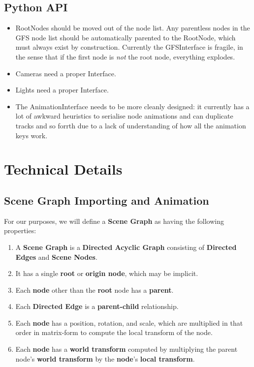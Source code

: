 \documentclass{article}
\begin{document}
\subsection{Python API}
\begin{itemize}
\item RootNodes should be moved out of the node list. Any parentless nodes in the GFS node list should be automatically parented to the RootNode, which must always exist by construction. Currently the GFSInterface is fragile, in the sense that if the first node is \textit{not} the root node, everything explodes.
\item Cameras need a proper Interface.
\item Lights need a proper Interface.
\item The AnimationInterface needs to be more cleanly designed: it currently has a lot of awkward heuristics to serialise node animations and can duplicate tracks and so forrth due to a lack of understanding of how all the animation keys work.
\end{itemize}

\clearpage

\section{Technical Details}
\subsection{Scene Graph Importing and Animation}

For our purposes, we will define a \textbf{Scene Graph} as having the following properties:
\begin{enumerate}
\item A \textbf{Scene Graph} is a \textbf{Directed Acyclic Graph} consisting of \textbf{Directed Edges} and \textbf{Scene Nodes}.
\item It has a single \textbf{root} or \textbf{origin node}, which may be implicit.
\item Each \textbf{node} other than the \textbf{root} node has a \textbf{parent}.
\item Each \textbf{Directed Edge} is a \textbf{parent-child} relationship.
\item Each \textbf{node} has a position, rotation, and scale, which are multiplied in that order in matrix-form to compute the local transform of the node.
\item Each \textbf{node} has a \textbf{world transform} computed by multiplying the parent node's \textbf{world transform} by the \textbf{node}'s \textbf{local transform}.
\end{enumerate}
\end{document}
